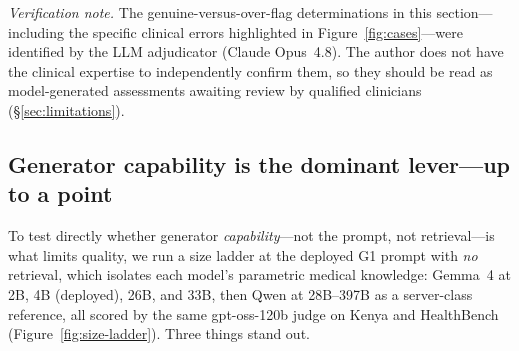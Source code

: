 \emph{Verification note.} The genuine-versus-over-flag determinations in this
section---including the specific clinical errors highlighted in
Figure~\ref{fig:cases}---were identified by the LLM adjudicator (Claude
Opus~4.8). The author does not have the clinical expertise to independently
confirm them, so they should be read as model-generated assessments awaiting
review by qualified clinicians (\S\ref{sec:limitations}).

\subsection{Generator capability is the dominant lever---up to a point}
\label{sec:model-size}

To test directly whether generator \emph{capability}---not the prompt, not
retrieval---is what limits quality, we run a size ladder at the deployed G1
prompt with \emph{no} retrieval, which isolates each model's parametric
medical knowledge: Gemma~4 at 2B, 4B (deployed), 26B, and 33B, then Qwen at
28B--397B as a server-class reference, all scored by the same gpt-oss-120b
judge on Kenya and HealthBench (Figure~\ref{fig:size-ladder}). Three things
stand out.

